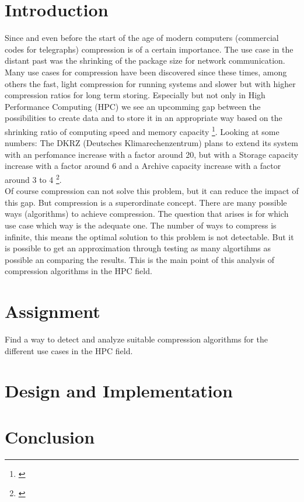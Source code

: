 \documentclass[
	12pt,
	a4paper,
	BCOR10mm,
	DIV14,
	listof=totoc,
	bibliography=totoc,
	headsepline
]{scrreprt}
\newcommand*{\mcite}[1]{\footnote{\cite{#1}}}
\begin{document}
\chapter{Introduction}
\label{Introduction}
Since and even before the start of the age of modern computers (commercial codes for telegraphs) compression is of a certain importance. 
The use case in the distant past was the shrinking of the package size for network communication.
Many use cases for compression have been discovered since these times, among others the fast, light compression for running systems and slower but with higher compression ratios for long term storing.
Especially but not only in High Performance Computing (HPC) we see an upcomming gap between the possibilities to create data and to store it in an appropriate way based on the shrinking ratio of computing speed and memory capacity \mcite{ExaStoSy}.
Looking at some numbers: The DKRZ (Deutsches Klimarechenzentrum) plans to extend its system with an perfomance increase with a factor around 20, but with a Storage capacity increase with a factor around 6 and a Archive capacity increase with a factor around 3 to 4 \mcite{ExaStoSy}. \\
Of course compression can not solve this problem, but it can reduce the impact of this gap.
But compression is a superordinate concept.
There are many possible ways (algorithms) to achieve compression.
The question that arises is for which use case which way is the adequate one.
The number of ways to compress is infinite, this means the optimal solution to this problem is 
not detectable.
But it is possible to get an approximation through testing as many algortihms as possible an comparing the results.
This is the main point of this analysis of compression algorithms in the HPC field.


\chapter{Assignment}
\label{Assignment}
Find a way to detect and analyze suitable compression algorithms for the different use cases in the HPC field.

\chapter{Design and Implementation}
\label{Design}


\chapter{Conclusion}
\label{Conclusion}
\end{document}
